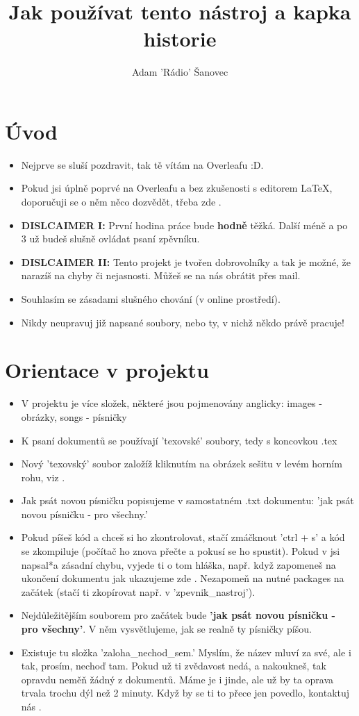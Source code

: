 \documentclass[12pt, notitlepage]{scrartcl}
\title{Jak používat tento nástroj a kapka historie}
\author{Adam 'Rádio' Šanovec}
\begin{document}
\maketitle
\section{Úvod}
\begin{itemize}
    \item Nejprve se sluší pozdravit, tak tě vítám na Overleafu :D.
    \item Pokud jsi úplně poprvé na Overleafu a bez zkušenosti s editorem \LaTeX, doporučuji se o něm něco dozvědět, třeba zde \cite{bib:novacci}.
    \item \textbf{DISLCAIMER I:} První hodina práce bude \textbf{hodně} těžká. Další méně a po 3 už budeš slušně ovládat psaní zpěvníku.
    \item \textbf{DISLCAIMER II:} Tento projekt je tvořen dobrovolníky a tak je možné, že narazíš na chyby či nejasnosti. Můžeš se na nás obrátit přes \cite{bib:kontakt} mail.
    \item Souhlasím se zásadami slušného chování (v online prostředí).
    \item Nikdy neupravuj již napsané soubory, nebo ty, v nichž někdo právě pracuje!
\end{itemize}

\section{Orientace v projektu}
\begin{itemize}
    \item V projektu je více složek, některé jsou pojmenovány anglicky: images - obrázky, songs - písničky
    \item K psaní dokumentů se používají 'texovské' soubory, tedy s koncovkou .tex
    \item Nový 'texovský' soubor založíž kliknutím na obrázek sešitu v levém horním rohu, viz \cite{file} .
    \item Jak psát novou písničku popisujeme v samostatném .txt dokumentu: 'jak psát novou písničku - pro všechny.'
    \item Pokud píšeš kód a chceš si ho zkontrolovat, stačí zmáčknout 'ctrl $+$ s' a kód se zkompiluje (počítač ho znova přečte a pokusí se ho spustit). Pokud v jsi napsal*a zásadní chybu, vyjede ti o tom hláška, např. když zapomeneš na ukončení dokumentu jak ukazujeme zde \cite{mistake}. Nezapomeň na nutné packages na začátek (stačí ti zkopírovat např. v 'zpevnik\_nastroj').
    \item Nejdůležitějším souborem pro začátek bude \textbf{ 'jak psát novou písničku - pro všechny'}. V něm vysvětlujeme, jak se realně ty písničky píšou.
    \item Existuje tu složka 'zaloha\_nechod\_sem.' Myslím, že název mluví za své, ale i tak, prosím, nechoď tam. Pokud už ti zvědavost nedá, a nakoukneš, tak opravdu neměň žádný z dokumentů. Máme je i jinde, ale už by ta oprava trvala trochu dýl než 2 minuty. Když by se ti to přece jen povedlo, kontaktuj nás \cite{bib:kontakt}.
\end{itemize}
\end{document}
